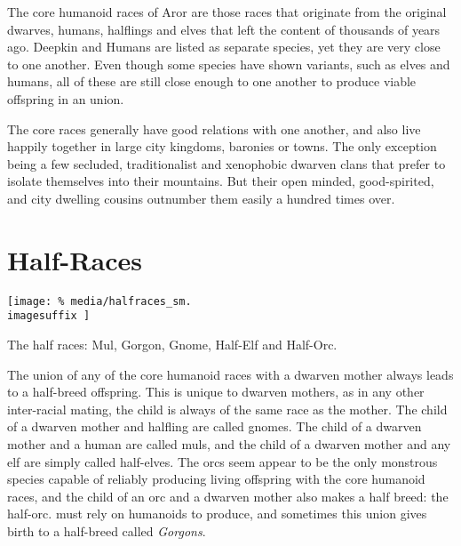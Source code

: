 The core humanoid races of Aror are those races that originate from the
original dwarves, humans, halflings and elves that left the content of
 thousands of years ago. Deepkin and Humans are listed as
separate species, yet they are very close to one another. Even though some
species have shown variants, such as elves and humans, all of these are still
close enough to one another to produce viable offspring in an union.

The core races generally have good relations with one another, and also live
happily together in large city kingdoms, baronies or towns. The only exception
being a few secluded, traditionalist and xenophobic dwarven clans that prefer
to isolate themselves into their mountains. But their open minded,
good-spirited, and city dwelling cousins outnumber them easily a hundred times
over.








\section{Half-Races}
\label{sec:Half-Races}

\ifimages
\begin{figure*}[ht!]
  \centering
  \vspace{-2.6cm}
  \centerline{
    \texttt{[image: \%
      media/halfraces\_sm.\\imagesuffix
    ]}
  }
  \par
  The half races: Mul, Gorgon, Gnome, Half-Elf and Half-Orc.
\end{figure*}
\fi

The union of any of the core humanoid races with a dwarven mother always leads
to a half-breed offspring. This is unique to dwarven mothers, as in any other
inter-racial mating, the child is always of the same race as the mother. The
child of a dwarven mother and halfling are called gnomes. The child of a
dwarven mother and a human are called muls, and the child of a dwarven mother
and any elf are simply called half-elves. The orcs seem appear to be the only
monstrous species capable of reliably producing living offspring with the
core humanoid races, and the child of an orc and a dwarven mother also makes
a half breed: the half-orc.  must rely on humanoids to
produce, and sometimes this union gives birth to a half-breed called
\emph{Gorgons}.

